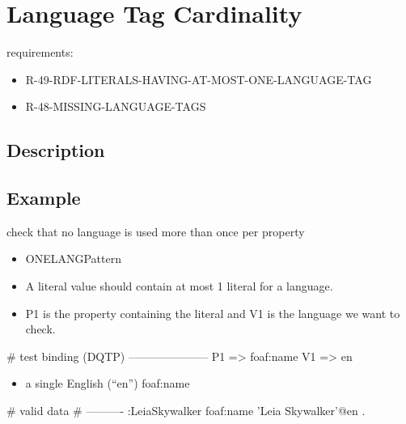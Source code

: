 \documentclass{llncs}
\begin{document}
\section{Language Tag Cardinality}

requirements:

\begin{itemize}
	\item R-49-RDF-LITERALS-HAVING-AT-MOST-ONE-LANGUAGE-TAG
	\item R-48-MISSING-LANGUAGE-TAGS
\end{itemize}
 
\subsection{Description}

\subsection{Example}

check that no language is used more than once per property


\begin{itemize}
	\item ONELANGPattern \cite{Kontokostas2014} 
  \item A literal value should contain at most 1 literal for a language. 
  \item P1 is the property containing the literal and V1 is the language we want to check.
\end{itemize}

\begin{ex}
# test binding (DQTP)
---------------------
P1 => foaf:name
V1 => en
\end{ex}

\begin{itemize}
	\item a single English (“en”) foaf:name
\end{itemize}

\begin{ex}
# valid data
# ----------
:LeiaSkywalker
    foaf:name 'Leia Skywalker'@en .
\end{ex}
\end{document}
